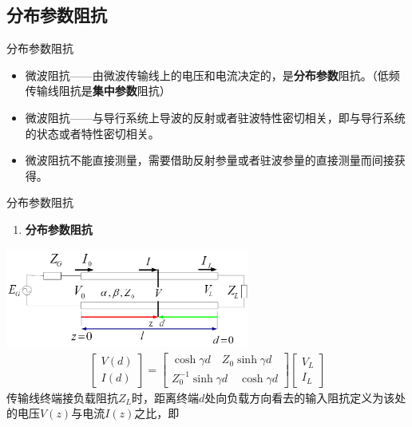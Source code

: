 \subsection{分布参数阻抗}
\begin{frame}{分布参数阻抗}
 \begin{itemize}
  \item 微波阻抗——由微波传输线上的电压和电流决定的，是\textbf{分布参数}阻抗。（低频传输线阻抗是\textbf{集中参数}阻抗）
  \item 微波阻抗——与导行系统上导波的反射或者驻波特性密切相关，即与导行系统的状态或者特性密切相关。
  \item 微波阻抗不能直接测量，需要借助反射参量或者驻波参量的直接测量而间接获得。
 \end{itemize}
\end{frame}

\begin{frame}{分布参数阻抗}
 \begin{enumerate}
  \item \textbf{分布参数阻抗}
        \saveenum
 \end{enumerate}
 \centering
 \includegraphics[width=8cm]{tmlineboundary.png}
 \begin{align*}
  \begin{bmatrix}
   V(d) \\I(d)
  \end{bmatrix}=
  \begin{bmatrix}
   \cosh\gamma d\quad Z_{0}\sinh\gamma d \\
   Z_{0}^{-1}\sinh\gamma d\quad \cosh\gamma d
  \end{bmatrix}
  \begin{bmatrix}
   V_{L} \\I_{L}
  \end{bmatrix}
 \end{align*}
 \flushleft
 传输线终端接负载阻抗$Z_{L}$时，距离终端$d$处向负载方向看去的输入阻抗定义为该处的电压$V(z)$与电流$I(z)$之比，即
\end{frame}


